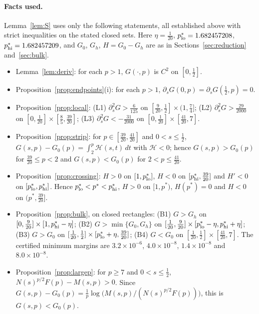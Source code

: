 \documentclass[11pt]{article}
\theoremstyle{remark}
\begin{document}
\paragraph{Facts used.} Lemma~\ref{lem:S} uses only the following statements, all established above with strict inequalities on the stated closed sets. Here $\eta=\frac1{20}$, $p^*_{\rm lo}=1.682457208$, $p^*_{\rm hi}=1.682457209$, and $G_0$, $G_h$, $H=G_0-G_h$ are as in Sections~\ref{sec:reduction} and~\ref{sec:bulk}.
\begin{itemize}
\item[(F1)] Lemma~\ref{lem:deriv}: for each $p>1$, $G(\cdot,p)$ is $C^2$ on $[0,\frac12]$.
\item[(F2)] Proposition~\ref{prop:endpoints}(i): for each $p>1$, $\partial_sG(0,p)=\partial_sG(\frac12,p)=0$.
\item[(F3)] Proposition~\ref{prop:local}: (L1) $\partial_s^2G>\frac6{125}$ on $[\frac9{20},\frac12]\times(1,\frac74]$; (L2) $\partial_s^2G>\frac{29}{2000}$ on $[0,\frac1{20}]\times[\frac85,\frac{39}{20}]$; (L3) $\partial_s^2G<-\frac{31}{2000}$ on $[0,\frac1{20}]\times[\frac{41}{20},7]$.
\item[(F4)] Proposition~\ref{prop:strip}: for $p\in[\frac{39}{20},\frac{41}{20}]$ and $0<s\le\frac12$, $G(s,p)-G_0(p)=\int_2^p\mathcal H(s,t)\,dt$ with $\mathcal H<0$; hence $G(s,p)>G_0(p)$ for $\frac{39}{20}\le p<2$ and $G(s,p)<G_0(p)$ for $2<p\le\frac{41}{20}$.
\item[(F5)] Proposition~\ref{prop:crossing}: $H>0$ on $[1,p^*_{\rm lo}]$, $H<0$ on $[p^*_{\rm hi},\frac{39}{20}]$ and $H'<0$ on $[p^*_{\rm lo},p^*_{\rm hi}]$. Hence $p^*_{\rm lo}<p^*<p^*_{\rm hi}$, $H>0$ on $[1,p^*)$, $H(p^*)=0$ and $H<0$ on $(p^*,\frac{39}{20}]$.
\item[(F6)] Proposition~\ref{prop:bulk}, on closed rectangles: (B1) $G>G_h$ on $[0,\frac9{20}]\times[1,p^*_{\rm hi}-\eta]$; (B2) $G>\min\{G_0,G_h\}$ on $[\frac1{20},\frac9{20}]\times[p^*_{\rm lo}-\eta,p^*_{\rm hi}+\eta]$; (B3) $G>G_0$ on $[\frac1{20},\frac12]\times[p^*_{\rm lo}+\eta,\frac{39}{20}]$; (B4) $G<G_0$ on $[\frac1{20},\frac12]\times[\frac{41}{20},7]$. The certified minimum margins are $3.2\times10^{-6}$, $4.0\times10^{-8}$, $1.4\times10^{-8}$ and $8.0\times10^{-8}$.
\item[(F7)] Proposition~\ref{prop:largep}: for $p\ge7$ and $0<s\le\frac12$, $N(s)^{p/2}F(p)-M(s,p)>0$. Since $G(s,p)-G_0(p)=\frac1p\log\bigl(M(s,p)/(N(s)^{p/2}F(p))\bigr)$, this is $G(s,p)<G_0(p)$.
\end{itemize}
\end{document}

